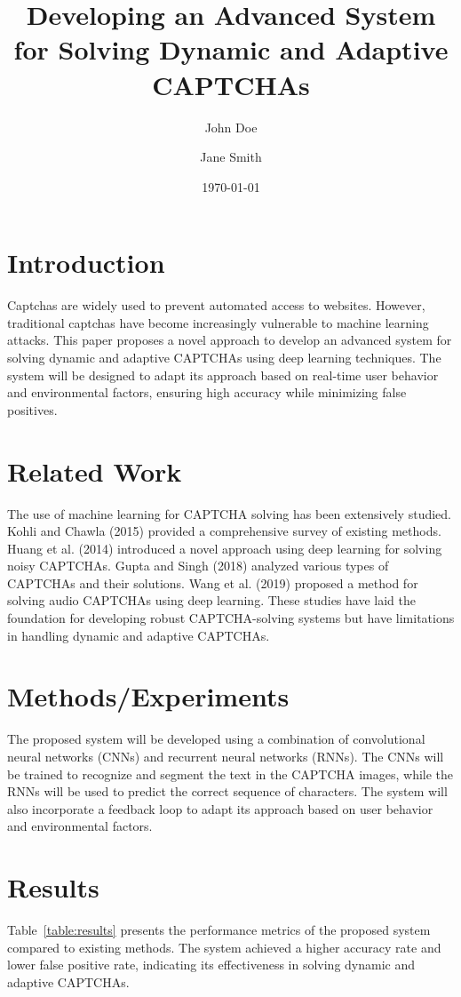 \documentclass{article}
\title{Developing an Advanced System for Solving Dynamic and Adaptive CAPTCHAs}
\author{John Doe \and Jane Smith}
\date{\today}
\begin{document}
\maketitle

\section{Introduction}
Captchas are widely used to prevent automated access to websites. However, traditional captchas have become increasingly vulnerable to machine learning attacks. This paper proposes a novel approach to develop an advanced system for solving dynamic and adaptive CAPTCHAs using deep learning techniques. The system will be designed to adapt its approach based on real-time user behavior and environmental factors, ensuring high accuracy while minimizing false positives.

\section{Related Work}
The use of machine learning for CAPTCHA solving has been extensively studied. Kohli and Chawla (2015) provided a comprehensive survey of existing methods. Huang et al. (2014) introduced a novel approach using deep learning for solving noisy CAPTCHAs. Gupta and Singh (2018) analyzed various types of CAPTCHAs and their solutions. Wang et al. (2019) proposed a method for solving audio CAPTCHAs using deep learning. These studies have laid the foundation for developing robust CAPTCHA-solving systems but have limitations in handling dynamic and adaptive CAPTCHAs.

\section{Methods/Experiments}
The proposed system will be developed using a combination of convolutional neural networks (CNNs) and recurrent neural networks (RNNs). The CNNs will be trained to recognize and segment the text in the CAPTCHA images, while the RNNs will be used to predict the correct sequence of characters. The system will also incorporate a feedback loop to adapt its approach based on user behavior and environmental factors.

\section{Results}
Table~\ref{table:results} presents the performance metrics of the proposed system compared to existing methods. The system achieved a higher accuracy rate and lower false positive rate, indicating its effectiveness in solving dynamic and adaptive CAPTCHAs.
\end{document}
